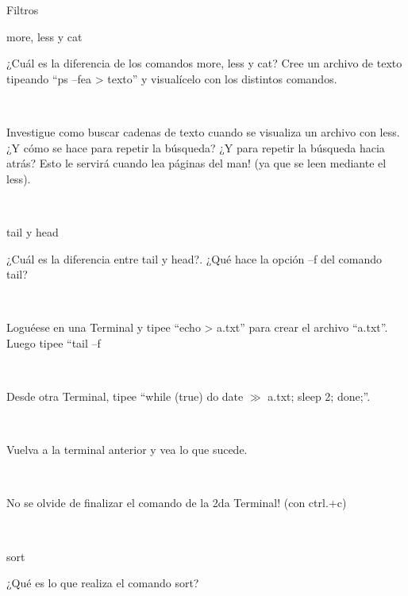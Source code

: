 \begin{section}{Filtros}

\begin{subsection}{more, less y cat}
\begin{quoting}
¿Cuál es la diferencia de los comandos more, less y cat? Cree un archivo de texto tipeando “ps –fea >
texto” y visualícelo con los distintos comandos.
\end{quoting}\\

\begin{quoting}
Investigue como buscar cadenas de texto cuando se visualiza un archivo con less. ¿Y cómo se hace
para repetir la búsqueda? ¿Y para repetir la búsqueda hacia atrás? Esto le servirá cuando lea páginas del
man! (ya que se leen mediante el less).
\end{quoting}\\

\end{subsection}

\begin{subsection}{tail y head}
\begin{quoting}
¿Cuál es la diferencia entre tail y head?. ¿Qué hace la opción –f del comando tail?
\end{quoting}\\

\begin{quoting}
Loguéese en una Terminal y tipee “echo > a.txt” para crear el archivo “a.txt”. Luego tipee “tail –f
\end{quoting}\\

\begin{quoting}
Desde otra Terminal, tipee “while (true) do date $\gg$ a.txt; sleep 2; done;”.
\end{quoting}\\

\begin{quoting}
Vuelva a la terminal anterior y vea lo que sucede.
\end{quoting}\\

\begin{quoting}
No se olvide de finalizar el comando de la 2da Terminal! (con ctrl.+c)
\end{quoting}\\

\end{subsection}

\begin{subsection}{sort}
\begin{quoting}
¿Qué es lo que realiza el comando sort?
\end{quoting}\\


\end{subsection}
\end{section}
